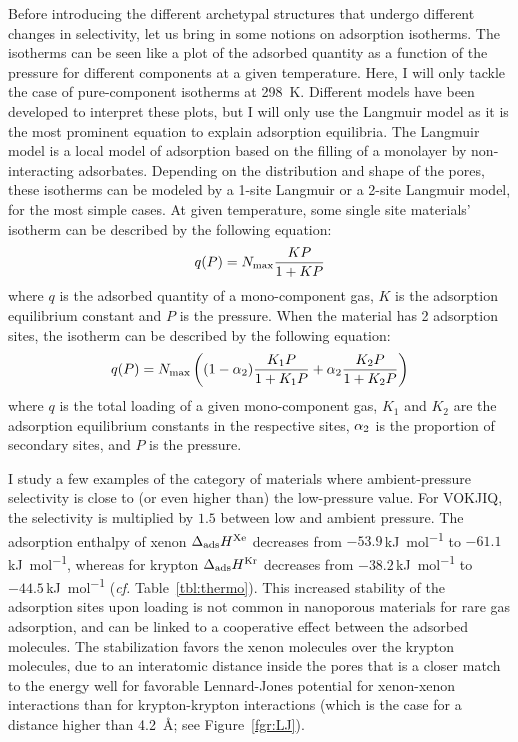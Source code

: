 \documentclass[main.tex]{subfiles}
\begin{document}
Before introducing the different archetypal structures that undergo different changes in selectivity, let us bring in some notions on adsorption isotherms. The isotherms  can be seen  like a plot of the adsorbed quantity as a function of the pressure for different components at a given temperature. Here, I will only tackle the case of pure-component isotherms at \SI{298}{\kelvin}. Different models have been developed to interpret these plots,\autocite{Al_Ghouti_2020} but I will only use the Langmuir model as it is the most prominent equation to explain adsorption equilibria. The Langmuir model is a local model of adsorption based on the filling of a monolayer by non-interacting adsorbates. Depending on the distribution and shape of the pores, these isotherms can be modeled by a 1-site Langmuir or a 2-site Langmuir model, for the most simple cases. At given temperature, some single site materials' isotherm can be described by the following equation:
\begin{equation}\label{eq:langmuir_1}
    q(P) = N_{\text{max}}\dfrac{KP}{1+KP}
\end{equation}
where $q$ is the adsorbed quantity of a mono-component gas, $K$ is the adsorption equilibrium constant and $P$ is the pressure. When the material has 2 adsorption sites, the isotherm can be described by the following equation:
\begin{equation}\label{eq:langmuir_2}
    q(P) = N_{\text{max}}\left((1-\alpha_{\text{2}})\dfrac{K_{\text{1}}P}{1+K_{\text{1}}P}+\alpha_{\text{2}}\dfrac{K_{\text{2}}P}{1+K_{\text{2}}P}\right)
\end{equation}
where $q$ is the total loading of a given mono-component gas, $K_1$ and $K_2$ are the adsorption equilibrium constants in the respective sites, $\alpha_{\text{2}}$ is the proportion of secondary sites, and $P$ is the pressure.
  
I study a few examples of the category of materials where ambient-pressure selectivity is close to (or even higher than) the low-pressure value. For VOKJIQ, the selectivity is multiplied by $1.5$ between low and ambient pressure. The adsorption enthalpy of xenon $\Delta_{\text{ads}}H^{\text{Xe}}$ decreases from $-53.9$\,\si{\kilo\joule\per\mol} to $-61.1$\,\si{\kilo\joule\per\mol}, whereas for krypton $\Delta_{\text{ads}}H^{\text{Kr}}$ decreases from $-38.2$\,\si{\kilo\joule\per\mol} to $-44.5$\,\si{\kilo\joule\per\mol} (\emph{cf.} Table~\ref{tbl:thermo}). This increased stability of the adsorption sites upon loading is not common in nanoporous materials for rare gas adsorption, and can be linked to a cooperative effect between the adsorbed molecules. The stabilization favors the xenon molecules over the krypton molecules, due to an interatomic distance inside the pores that is a closer match to the energy well for favorable Lennard-Jones potential for xenon-xenon interactions than for krypton-krypton interactions (which is the case for a distance higher than \SI{4.2}{\angstrom}; see Figure~\ref{fgr:LJ}).
\end{document}
